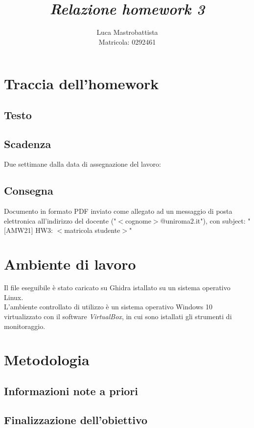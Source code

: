 \documentclass[a4paper, 12pt]{article}
\begin{document}
\sloppy
  
\title{
  \textbf{
    \emph{Relazione homework 3}
  }
}  
\author{Luca Mastrobattista\\ Matricola: 0292461}
\date{}
\maketitle

\tableofcontents
\newpage
\section{Traccia dell'homework}
\subsection{Testo}

\subsection{Scadenza}
Due settimane dalla data di assegnazione del lavoro: 
\subsection{Consegna}
Documento in formato PDF inviato come allegato ad
un messaggio di posta elettronica all'indirizzo del docente
("$<$cognome$>$@uniroma2.it"), con subject:
"[AMW21] HW3: $<$matricola studente$>$"

\newpage
\section{Ambiente di lavoro}
Il file eseguibile è stato caricato su Ghidra istallato su un sistema operativo Linux. \\
L'ambiente controllato di utilizzo è un sistema operativo Windows 10 virtualizzato con il software \emph{VirtualBox}, in cui sono istallati gli strumenti di monitoraggio.


\newpage
\section{Metodologia}

\subsection{Informazioni note a priori}


\subsection{Finalizzazione dell'obiettivo}
\end{document}
